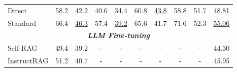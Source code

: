 \begin{table*}[t]
{\begin{tabular}{@{}lccccccccc@{}}
\multicolumn{1}{l|}{Direct}                                                                           & 58.2                            & \multicolumn{1}{c|}{42.2}                                                    & 40.6                            & \multicolumn{1}{c|}{34.4}                                                    & 60.8                            & \multicolumn{1}{c|}{\underline{43.8}}                                        & 58.8                            & \multicolumn{1}{c|}{51.7}                                                    & 48.81                              \\
\multicolumn{1}{l|}{Standard}                                                                         & 66.4                            & \multicolumn{1}{c|}{\underline{46.3}}                                        & 57.4                            & \multicolumn{1}{c|}{\underline{39.2}}                                        & 65.6                            & \multicolumn{1}{c|}{41.7}                                                    & 71.6                            & \multicolumn{1}{c|}{52.3}                                                    & \underline{55.06}                  \\ \midrule
\multicolumn{10}{c}{\textit{\textbf{LLM Fine-tuning}}}                                                                                                                                                                                                                                                                                                                                                                                                                                                                                                                                                         \\ \midrule
\multicolumn{1}{l|}{Self-RAG}                                                                         & 49.4                            & \multicolumn{1}{c|}{39.2}                                                    & -                               & \multicolumn{1}{c|}{-}                                                       & -                               & \multicolumn{1}{c|}{-}                                                       & -                               & \multicolumn{1}{c|}{-}                                                       & 44.30                              \\
\multicolumn{1}{l|}{InstructRAG}                                                                      & 51.2                            & \multicolumn{1}{c|}{40.7}                                                    & -                               & \multicolumn{1}{c|}{-}                                                       & -                               & \multicolumn{1}{c|}{-}                                                       & -                               & \multicolumn{1}{c|}{-}                                                       & 45.95                              \\

\end{tabular}}
\end{table*}
